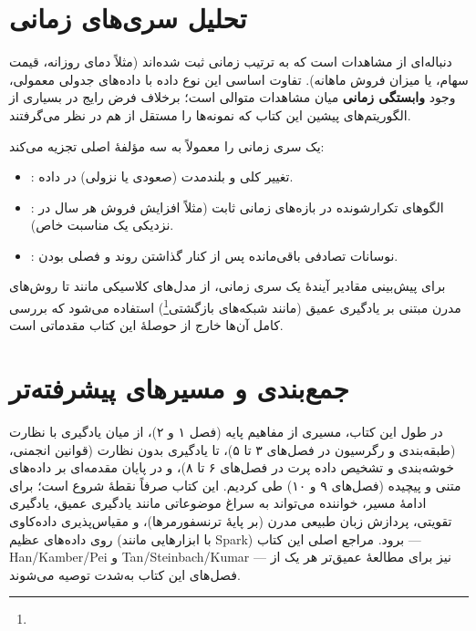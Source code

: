 \section{تحلیل سری‌های زمانی}

 دنباله‌ای از مشاهدات است که
به ترتیب زمانی ثبت شده‌اند (مثلاً دمای روزانه، قیمت سهام، یا میزان
فروش ماهانه). تفاوت اساسی این نوع داده با داده‌های جدولی معمولی، وجود
\textbf{وابستگی زمانی} میان مشاهدات متوالی است؛ برخلاف فرض رایج در
بسیاری از الگوریتم‌های پیشین این کتاب که نمونه‌ها را مستقل از هم در
نظر می‌گرفتند.

 یک سری
زمانی را معمولاً به سه مؤلفهٔ اصلی تجزیه می‌کند:

\begin{itemize}
    \item {}: تغییر کلی و بلندمدت (صعودی یا
          نزولی) در داده.
    \item {}: الگوهای تکرارشونده
          در بازه‌های زمانی ثابت (مثلاً افزایش فروش هر سال در نزدیکی
          یک مناسبت خاص).
    \item {}: نوسانات تصادفی باقی‌مانده
          پس از کنار گذاشتن روند و فصلی بودن.
\end{itemize}

برای پیش‌بینی مقادیر آیندهٔ یک سری زمانی، از مدل‌های کلاسیکی مانند
 تا
روش‌های مدرن مبتنی بر یادگیری عمیق (مانند شبکه‌های بازگشتی\footnote{})
استفاده می‌شود که بررسی
کامل آن‌ها خارج از حوصلهٔ این کتاب مقدماتی است.

\section{جمع‌بندی و مسیرهای پیشرفته‌تر}

در طول این کتاب، مسیری از مفاهیم پایه (فصل ۱ و ۲)، از میان یادگیری با
نظارت (طبقه‌بندی و رگرسیون در فصل‌های ۳ تا ۵)، تا یادگیری بدون نظارت
(قوانین انجمنی، خوشه‌بندی و تشخیص داده پرت در فصل‌های ۶ تا ۸)، و در
پایان مقدمه‌ای بر داده‌های متنی و پیچیده (فصل‌های ۹ و ۱۰) طی کردیم. این
کتاب صرفاً نقطهٔ شروع است؛ برای ادامهٔ مسیر، خواننده می‌تواند به سراغ
موضوعاتی مانند یادگیری عمیق، یادگیری تقویتی، پردازش زبان طبیعی مدرن (بر
پایهٔ ترنسفورمرها)، و مقیاس‌پذیری داده‌کاوی روی داده‌های عظیم (با
ابزارهایی مانند Spark) برود. مراجع اصلی این کتاب — Han/Kamber/Pei و
Tan/Steinbach/Kumar — نیز برای مطالعهٔ عمیق‌تر هر یک از فصل‌های این
کتاب به‌شدت توصیه می‌شوند.


